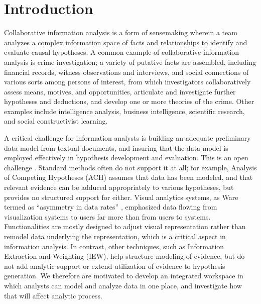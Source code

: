 \section{Introduction}\label{introduction}

Collaborative information analysis is a form of sensemaking wherein a
team analyzes a complex information space of facts and relationships to
identify and evaluate causal hypotheses. A common example of
collaborative information analysis is crime investigation; a variety of
putative facts are assembled, including financial records, witness
observations and interviews, and social connections of various sorts
among persons of interest, from which investigators collaboratively
assess means, motives, and opportunities, articulate and investigate
further hypotheses and deductions, and develop one or more theories of
the crime. Other examples include intelligence analysis, business
intelligence, scientific research, and social constructivist learning.

A critical challenge for information analysts is building an adequate
preliminary data model from textual documents, and insuring that the data model
is employed effectively in hypothesis development and evaluation. This is an
open challenge \autocite{Badalamente2005}. Standard methods often do not support
it at all; for example, Analysis of Competing Hypotheses (ACH) assumes that data
has been modeled, and that relevant evidence can be adduced appropriately to
various hypotheses, but provides no structured support for either. Visual
analytics systems, as Ware termed as ``asymmetry in data rates''
\autocite[382]{Ware2012}, emphasized data flowing from visualization systems to
users far more than from users to systems. Functionalities are mostly designed
to adjust visual representation rather than remodel data underlying the
representation, which is a critical aspect in information analysis. In contrast,
other techniques, such as Information Extraction and Weighting (IEW), help
structure modeling of evidence, but do not add analytic support or extend
utilization of evidence to hypothesis generation. We therefore are motivated to
develop an integrated workspace in which analysts can model and analyze data in
one place, and investigate how that will affect analytic process.

